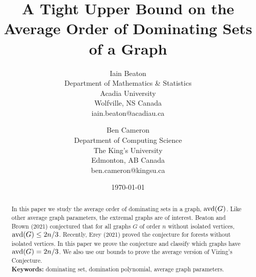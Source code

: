 \documentclass[11pt]{article}
\newcommand{\avd}{\text{\rm{avd}}}
\begin{document}
\title{A Tight Upper Bound on the Average Order of Dominating Sets of a Graph}
\author{Iain Beaton\\
\small Department of Mathematics \& Statistics\\
\small Acadia University\\
\small Wolfville, NS Canada\\
\small iain.beaton@acadiau.ca\\
\and
Ben Cameron\\
\small Department of Computing Science\\
\small The King's University\\
\small Edmonton, AB Canada\\
\small ben.cameron@kingsu.ca\\
}

\date{\today}

\maketitle


\begin{abstract}
In this paper we study the average order of dominating sets in a graph, $\avd(G)$. Like other average graph parameters, the extremal graphs are of interest. Beaton and Brown (2021) %
conjectured that for all graphs $G$ of order $n$ without isolated vertices, $\avd(G) \leq 2n/3$. Recently, Erey (2021) proved the conjecture for forests without isolated vertices. In this paper we prove the conjecture and classify which graphs have $\avd(G) = 2n/3$. We also use our bounds to prove the average version of Vizing's Conjecture.\\

\noindent\textbf{Keywords:} dominating set, domination polynomial, average graph parameters.
\end{abstract}


\end{document}
